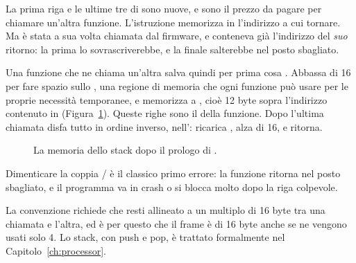 La prima riga e le ultime tre di  sono nuove, e sono il
prezzo da pagare per chiamare un'altra funzione. L'istruzione 
memorizza in  l'indirizzo a cui tornare. Ma  è stata
a sua volta chiamata dal firmware, e  conteneva già l'indirizzo del
\emph{suo} ritorno: la prima  lo sovrascriverebbe, e la 
finale salterebbe nel posto sbagliato.

Una funzione che ne chiama un'altra salva quindi per prima cosa .
Abbassa  di 16 per fare spazio sullo , una regione di
memoria che ogni funzione può usare per le proprie necessità temporanee, e
memorizza  a , cioè 12 byte sopra l'indirizzo contenuto in
 (Figura~\ref{fig:fc:stack}). Queste righe sono il  della
funzione. Dopo l'ultima chiamata disfa tutto in ordine inverso,
nell': ricarica , alza  di 16, e ritorna.

\begin{figure}[htb]
\centering
{}
\caption{La memoria dello stack dopo il prologo di .}
\label{fig:fc:stack}
\end{figure}

\begin{prgwarn}
Dimenticare la coppia / è il classico primo errore: la
funzione ritorna nel posto sbagliato, e il programma va in crash o si blocca
molto dopo la riga colpevole.
\end{prgwarn}

La convenzione richiede che  resti allineato a un multiplo di 16 byte
tra una chiamata e l'altra, ed è per questo che il frame è di 16 byte anche se
ne vengono usati solo 4. Lo stack, con push e pop, è trattato formalmente nel
Capitolo~\ref{ch:processor}.

